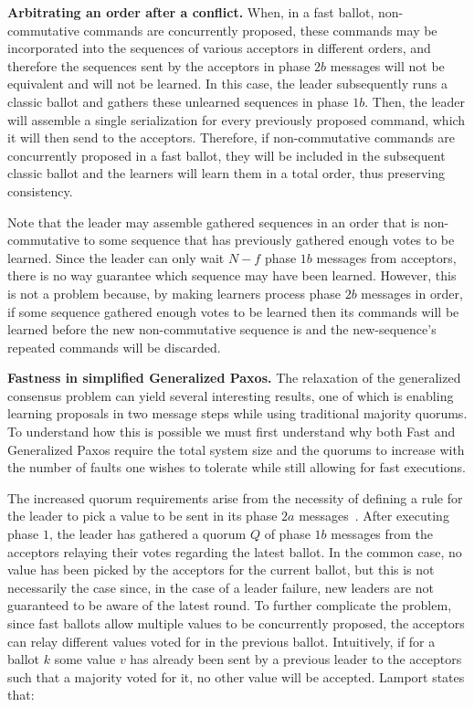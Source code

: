 \noindent \textbf{Arbitrating an order after a conflict.} When, in a fast ballot, non-commutative commands are  concurrently proposed, these commands may be incorporated into the sequences of various acceptors in different orders, and therefore the sequences sent by the acceptors in phase $2b$ messages will not be equivalent and will not be learned. In this case, the leader subsequently runs a classic ballot and gathers these unlearned sequences in phase $1b$. Then, the leader will assemble a single serialization for every previously proposed command, which it will then send to the acceptors. Therefore, if non-commutative commands are concurrently proposed in a fast ballot, they will be included in the subsequent classic ballot and the learners will learn them in a total order, thus preserving consistency. \par 
Note that the leader may assemble gathered sequences in an order that is non-commutative to some sequence that has previously gathered enough votes to be learned. Since the leader can only wait $N-f$ phase $1b$ messages from acceptors, there is no way guarantee which sequence may have been learned. However, this is not a problem because, by making learners process phase $2b$ messages in order, if some sequence gathered enough votes to be learned then its commands will be learned before the new non-commutative sequence is and the new-sequence's repeated commands will be discarded.\par

\noindent \textbf{Fastness in simplified Generalized Paxos.} 
The relaxation of the generalized consensus problem can yield several interesting results, one of which is enabling learning proposals in two message steps while using traditional majority quorums. To understand how this is possible we must first understand why both Fast and Generalized Paxos require the total system size and the quorums to increase with the number of faults one wishes to tolerate while still allowing for fast executions. \par
The increased quorum requirements arise from the necessity of defining a rule for the leader to pick a value to be sent in its phase $2a$ messages~\cite{Lamport2006}. After executing phase $1$, the leader has gathered a quorum $Q$ of phase $1b$ messages from the acceptors relaying their votes regarding the latest ballot. In the common case, no value has been picked by the acceptors for the current ballot, but this is not necessarily the case since, in the case of a leader failure, new leaders are not guaranteed to be aware of the latest round. To further complicate the problem, since fast ballots allow multiple values to be concurrently proposed, the acceptors can relay different values voted for in the previous ballot. Intuitively, if for a ballot $k$ some value $v$ has already been sent by a previous leader to the acceptors such that a majority voted for it, no other value will be accepted. Lamport states that:\par

